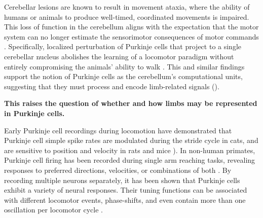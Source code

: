 Cerebellar lesions are known to result in movement ataxia, where the ability of humans or animals to produce well-timed, coordinated movements is impaired. This loss of function in the cerebellum aligns with the expectation that the motor system can no longer estimate the sensorimotor consequences of motor commands \cite{bastian_cerebellar_1996, bastian_learning_2006, machado_quantitative_2015}. Specifically, localized perturbation of Purkinje cells that project to a single cerebellar nucleus abolishes the learning of a locomotor paradigm without entirely compromising the animals' ability to walk \cite{darmohray_spatial_2019}. This and similar findings support the notion of Purkinje cells as the cerebellum's computational units, suggesting that they must process and encode limb-related signals (). 

\textbf{This raises the question of whether and how limbs may be represented in Purkinje cells.}

Early Purkinje cell recordings during locomotion have demonstrated that Purkinje cell simple spike rates are modulated during the stride cycle in cats, and are sensitive to position and velocity in rats and mice \cite{udoSimpleComplexSpike1981, armstrongDischargesPurkinjeCells1984, smithSensorimotorcorrelatedDischargeRecorded1995, sauerbreiStructuredVariabilityPurkinje2015}).
In non-human primates, Purkinje cell firing has been recorded during single arm reaching tasks, revealing responses to preferred directions, velocities, or combinations of both \cite{coltzCerebellarPurkinjeCell1999}.
By recording multiple neurons separately, it has been shown that Purkinje cells exhibit a variety of neural responses. Their tuning functions can be associated with different locomotor events, phase-shifts, and even contain more than one oscillation per locomotor cycle \cite{sarnaikControlVoluntaryOptogenetically2018, muzzuEncodingLocomotionKinematics2018}.




